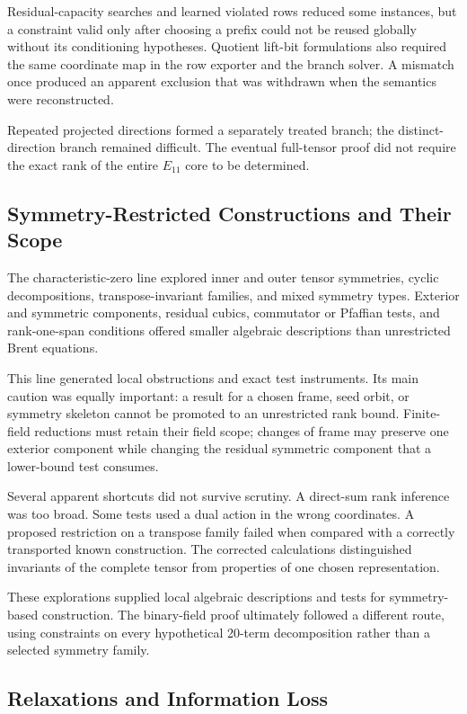 Residual-capacity searches and learned violated rows reduced some
instances, but a constraint valid only after choosing a prefix could
not be reused globally without its conditioning hypotheses. Quotient
lift-bit formulations also required the same coordinate map in the
row exporter and the branch solver. A mismatch once produced an
apparent exclusion that was withdrawn when the semantics were
reconstructed.

Repeated projected directions formed a separately treated branch;
the distinct-direction branch remained difficult. The eventual
full-tensor proof did not require the exact rank of the entire
$E_{11}$ core to be determined.

\subsection{Symmetry-Restricted Constructions and Their Scope}
\label{route:symmetry}

The characteristic-zero line explored inner and outer tensor symmetries,
cyclic decompositions, transpose-invariant families, and mixed
symmetry types. Exterior and symmetric components, residual cubics,
commutator or Pfaffian tests, and rank-one-span conditions offered
smaller algebraic descriptions than unrestricted Brent equations.

This line generated local obstructions and exact test instruments.
Its main caution was equally important: a result for a chosen frame,
seed orbit, or symmetry skeleton cannot be promoted to an unrestricted
rank bound. Finite-field reductions must retain their field scope;
changes of frame may preserve one exterior component while changing
the residual symmetric component that a lower-bound test consumes.

Several apparent shortcuts did not survive scrutiny. A direct-sum
rank inference was too broad. Some tests used a dual action in the
wrong coordinates. A proposed restriction on a transpose family
failed when compared with a correctly transported known construction.
The corrected calculations distinguished invariants of the complete
tensor from properties of one chosen representation.

These explorations supplied local algebraic descriptions and tests
for symmetry-based construction. The binary-field proof ultimately
followed a different route, using constraints on every hypothetical
20-term decomposition rather than a selected symmetry family.

\subsection{Relaxations and Information Loss}\label{route:relaxation}

